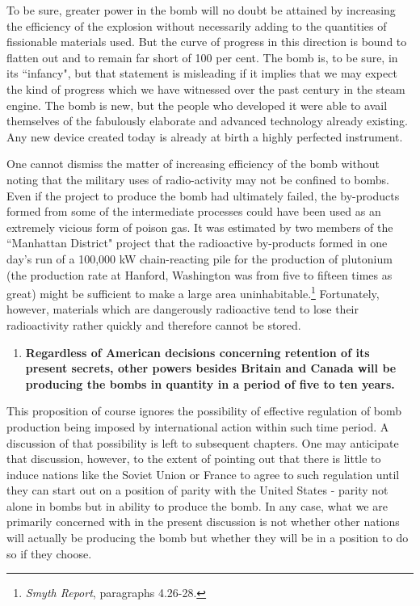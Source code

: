 To be sure, greater power in the bomb will no doubt be attained by increasing the efficiency of the explosion without necessarily adding to the quantities of fissionable materials used. But the curve of progress in this direction is bound to flatten out and to remain far short of 100 per cent. The bomb is, to be sure, in its ``infancy", but that statement is misleading if it implies that we may expect the kind of progress which we have witnessed over the past century in the steam engine. The bomb is new, but the people who developed it were able to avail themselves of the fabulously elaborate and advanced technology already existing. Any new device created today is already at birth a highly perfected instrument.

One cannot dismiss the matter of increasing efficiency of the bomb without noting that the military uses of radio-activity may not be confined to bombs. Even if the project to produce the bomb had ultimately failed, the by-products formed from some of the intermediate processes could have been used as an extremely vicious form of poison gas. It was estimated by two members of the ``Manhattan District" project that the radioactive by-products formed in one day's run of a 100,000 kW chain-reacting pile for the production of plutonium (the production rate at Hanford, Washington was from five to fifteen times as great) might be sufficient to make a large area uninhabitable.\footnote{\emph{Smyth Report}, paragraphs 4.26-28.} Fortunately, however, materials which are dangerously radioactive tend to lose their radioactivity rather quickly and therefore cannot be stored.

\begin{enumerate}[resume*]

\item \textbf{Regardless of American decisions concerning retention of its present secrets, other powers besides Britain and Canada will be producing the bombs in quantity in a period of five to ten years.}

\end{enumerate}

This proposition of course ignores the possibility of effective regulation of bomb production being imposed by international action within such time period. A discussion of that possibility is left to subsequent chapters. One may anticipate that discussion, however, to the extent of pointing out that there is little to induce nations like the Soviet Union or France to agree to such regulation until they can start out on a position of parity with the United States - parity not alone in bombs but in ability to produce the bomb. In any case, what we are primarily concerned with in the present discussion is not whether other nations will actually be producing the bomb but whether they will be in a position to do so if they choose.


